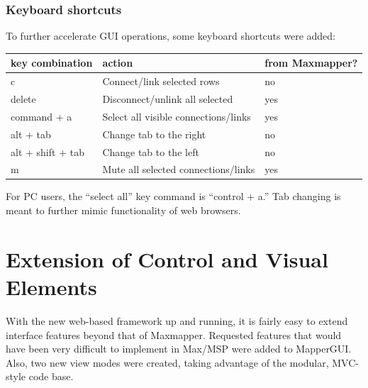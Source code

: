 
		\subsubsection{Keyboard shortcuts}

To further accelerate GUI operations, some keyboard shortcuts were added:

\begin{table}[!h]
	\centering
	\label{tab:list_view_shortcut_keys}
		\begin{tabular}{l  l  l}
		\hline\hline
		key combination&action&from Maxmapper?\\
		\hline
		c 					& Connect/link selected rows & no\\
		delete 				& Disconnect/unlink all selected & yes\\
		command + a 		& Select all visible connections/links & yes\\
		alt + tab 			& Change tab to the right & no\\
		alt + shift + tab 	& Change tab to the left & no\\ 
		m 					& Mute all selected connections/links & yes\\
		\end{tabular}
\end{table}

For PC users, the ``select all'' key command is ``control + a.'' Tab changing is meant to further mimic functionality of web browsers. 



\section{Extension of Control and Visual Elements} %
\label{sec:extension_of_control_and_visual_elements}

With the new web-based framework up and running, it is fairly easy to extend interface features beyond that of Maxmapper. Requested features that would have been very difficult to implement in Max/MSP were added to MapperGUI. Also, two new view modes were created, taking advantage of the modular, MVC-style code base.

